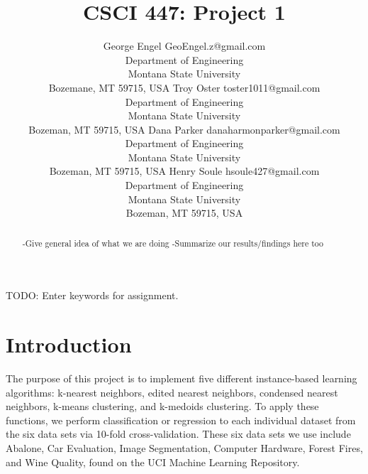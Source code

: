 \documentclass[twoside,11pt]{article}
\begin{document}
\title{CSCI 447: Project 1}

\author{\name George Engel \email GeoEngel.z@gmail.com \\
       \addr Department of Engineering\\
       Montana State University\\
       Bozemane, MT 59715, USA
       \AND
       \name Troy Oster \email toster1011@gmail.com \\
       \addr Department of Engineering\\
       Montana State University\\
       Bozeman, MT 59715, USA
       \AND
       \name Dana Parker \email danaharmonparker@gmail.com \\
       \addr Department of Engineering\\
       Montana State University\\
       Bozeman, MT 59715, USA
       \AND
       \name Henry Soule \email hsoule427@gmail.com \\
       \addr Department of Engineering\\
       Montana State University\\
       Bozeman, MT 59715, USA}


\maketitle

\begin{abstract}%

-Give general idea of what we are doing
-Summarize our results/findings here too

\end{abstract}

\begin{keywords}
    TODO: Enter keywords for assignment.
\end{keywords}

\section{Introduction}
The purpose of this project is to implement five different instance-based learning algorithms: k-nearest neighbors, edited nearest neighbors, condensed nearest neighbors, k-means clustering, and k-medoids clustering. To apply these functions, we perform classification or regression to each individual dataset from the six data sets via 10-fold cross-validation. These six data sets we use include Abalone, Car Evaluation, Image Segmentation, Computer Hardware, Forest Fires, and Wine Quality, found on the UCI Machine Learning Repository.
\end{document}
